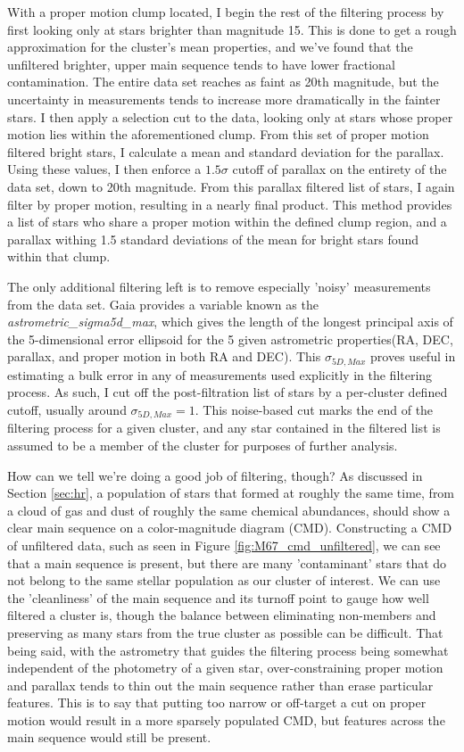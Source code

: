 \documentclass[onecolumn,table,xcdraw,super]{aastex631}
\begin{document}
With a proper motion clump located, I begin the rest of the filtering process by first looking only at stars brighter than magnitude 15. This is done to get a rough approximation for the cluster's mean properties, and we've found that the unfiltered brighter, upper main sequence tends to have lower fractional contamination. The entire data set reaches as faint as 20th magnitude, but the uncertainty in measurements tends to increase more dramatically in the fainter stars. I then apply a selection cut to the data, looking only at stars whose proper motion lies within the aforementioned clump. From this set of proper motion filtered bright stars, I calculate a mean and standard deviation for the parallax. Using these values, I then enforce a $1.5\sigma$ cutoff of parallax on the entirety of the data set, down to 20th magnitude. From this parallax filtered list of stars, I again filter by proper motion, resulting in a nearly final product. This method provides a list of stars who share a proper motion within the defined clump region, and a parallax withing 1.5 standard deviations of the mean for bright stars found within that clump.

The only additional filtering left is to remove especially 'noisy' measurements from the data set. Gaia provides a variable known as the \textit{astrometric\_sigma5d\_max}, which gives the length of the longest principal axis of the 5-dimensional error ellipsoid for the 5 given astrometric properties(RA, DEC, parallax, and proper motion in both RA and DEC). This $\sigma_{5D,Max}$ proves useful in estimating a bulk error in any of measurements used explicitly in the filtering process. As such, I cut off the post-filtration list of stars by a per-cluster defined cutoff, usually around  $\sigma_{5D,Max}=1$. This noise-based cut marks the end of the filtering process for a given cluster, and any star contained in the filtered list is assumed to be a member of the cluster for purposes of further analysis.

How can we tell we're doing a good job of filtering, though? As discussed in Section \ref{sec:hr}, a population of stars that formed at roughly the same time, from a cloud of gas and dust of roughly the same chemical abundances, should show a clear main sequence on a color-magnitude diagram (CMD). Constructing a CMD of unfiltered data, such as seen in Figure \ref{fig:M67_cmd_unfiltered}, we can see that a main sequence is present, but there are many 'contaminant' stars that do not belong to the same stellar population as our cluster of interest. We can use the 'cleanliness' of the main sequence and its turnoff point to gauge how well filtered a cluster is, though the balance between eliminating non-members and preserving as many stars from the true cluster as possible can be difficult. That being said, with the astrometry that guides the filtering process being somewhat independent of the photometry of a given star, over-constraining proper motion and parallax tends to thin out the main sequence rather than erase particular features. This is to say that putting too narrow or off-target a cut on proper motion would result in a more sparsely populated CMD, but features across the main sequence would still be present.
\end{document}
